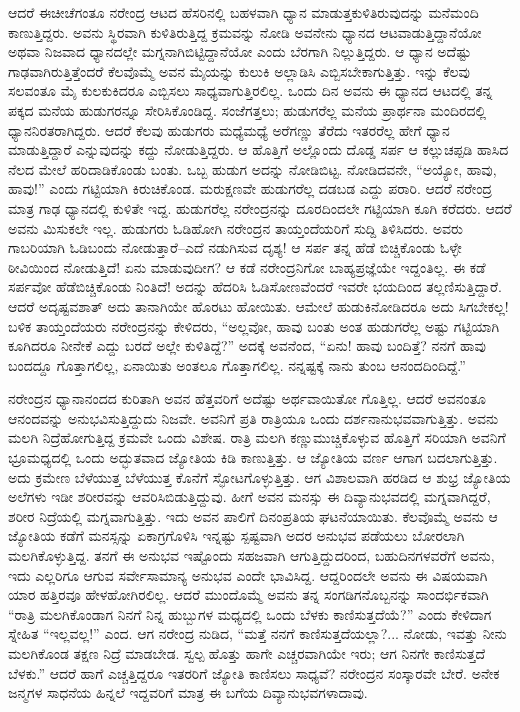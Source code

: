 ಆದರೆ ಈಚೀಚೆಗಂತೂ ನರೇಂದ್ರ ಆಟದ ಹೆಸರಿನಲ್ಲಿ ಬಹಳವಾಗಿ ಧ್ಯಾನ ಮಾಡುತ್ತಕುಳಿತಿರುವುದನ್ನು ಮನೆಮಂದಿ ಕಾಣುತ್ತಿದ್ದರು. ಅವನು ಸ್ಥಿರವಾಗಿ ಕುಳಿತಿರುತ್ತಿದ್ದ ಕ್ರಮವನ್ನು ನೋಡಿ ಅವನೇನು ಧ್ಯಾನದ ಆಟವಾಡುತ್ತಿದ್ದಾನೆಯೋ ಅಥವಾ ನಿಜವಾದ ಧ್ಯಾನದಲ್ಲೇ ಮಗ್ನನಾಗಿಬಿಟ್ಟಿದ್ದಾನೆಯೋ ಎಂದು ಬೆರಗಾಗಿ ನಿಲ್ಲುತ್ತಿದ್ದರು. ಆ ಧ್ಯಾನ ಅದೆಷ್ಟು ಗಾಢವಾಗಿರುತ್ತಿತ್ತೆಂದರೆ ಕೆಲವೊಮ್ಮೆ ಅವನ ಮೈಯನ್ನು ಕುಲುಕಿ ಅಲ್ಲಾಡಿಸಿ ಎಬ್ಬಿಸಬೇಕಾಗುತ್ತಿತ್ತು. ಇನ್ನು ಕೆಲವು ಸಲವಂತೂ ಮೈ ಕುಲಕುಕಿದರೂ ಎಬ್ಬಿಸಲು ಸಾಧ್ಯವಾಗುತ್ತಿರಲಿಲ್ಲ. ಒಂದು ದಿನ ಅವನು ಈ ಧ್ಯಾನದ ಆಟದಲ್ಲಿ ತನ್ನ ಪಕ್ಕದ ಮನೆಯ ಹುಡುಗರನ್ನೂ ಸೇರಿಸಿಕೊಂಡಿದ್ದ. ಸಂಜೆಗತ್ತಲು; ಹುಡುಗರೆಲ್ಲ ಮನೆಯ ಪ್ರಾರ್ಥನಾ ಮಂದಿರದಲ್ಲಿ ಧ್ಯಾನನಿರತರಾಗಿದ್ದರು. ಆದರೆ ಕೆಲವು ಹುಡುಗರು ಮಧ್ಯೆಮಧ್ಯೆ ಅರೆಗಣ್ಣು ತೆರೆದು ಇತರರೆಲ್ಲ ಹೇಗೆ ಧ್ಯಾನ ಮಾಡುತ್ತಿದ್ದಾರೆ ಎನ್ನುವುದನ್ನು ಕದ್ದು ನೋಡುತ್ತಿದ್ದರು. ಆ ಹೊತ್ತಿಗೆ ಅಲ್ಲೊಂದು ದೊಡ್ಡ ಸರ್ಪ ಆ ಕಲ್ಲುಚಪ್ಪಡಿ ಹಾಸಿದ ನೆಲದ ಮೇಲೆ ಹರಿದಾಡಿಕೊಂಡು ಬಂತು. ಒಬ್ಬ ಹುಡುಗ ಅದನ್ನು ನೋಡಿಬಿಟ್ಟ. ನೋಡಿದವನೇ, “ಅಯ್ಯೋ, ಹಾವು, ಹಾವು!” ಎಂದು ಗಟ್ಟಿಯಾಗಿ ಕಿರುಚಿಕೊಂಡ. ಮರುಕ್ಷಣವೇ ಹುಡುಗರೆಲ್ಲ ದಡಬಡ ಎದ್ದು ಪರಾರಿ. ಆದರೆ ನರೇಂದ್ರ ಮಾತ್ರ ಗಾಢ ಧ್ಯಾನದಲ್ಲಿ ಕುಳಿತೇ ಇದ್ದ. ಹುಡುಗರೆಲ್ಲ ನರೇಂದ್ರನನ್ನು ದೂರದಿಂದಲೇ ಗಟ್ಟಿಯಾಗಿ ಕೂಗಿ ಕರೆದರು. ಆದರೆ ಅವನು ಮಿಸುಕಲೇ ಇಲ್ಲ. ಹುಡುಗರು ಓಡಿಹೋಗಿ ನರೇಂದ್ರನ ತಾಯ್ತಂದೆಯರಿಗೆ ಸುದ್ದಿ ತಿಳಿಸಿದರು. ಅವರು ಗಾಬರಿಯಾಗಿ ಓಡಿಬಂದು ನೋಡುತ್ತಾರೆ–ಎದೆ ನಡುಗಿಸುವ ದೃಶ್ಯ! ಆ ಸರ್ಪ ತನ್ನ ಹೆಡೆ ಬಿಚ್ಚಿಕೊಂಡು ಓಳ್ಳೇ ಠೀವಿಯಿಂದ ನೋಡುತ್ತಿದೆ! ಏನು ಮಾಡುವುದೀಗ? ಆ ಕಡೆ ನರೇಂದ್ರನಿಗೋ ಬಾಹ್ಯಪ್ರಜ್ಞೆಯೇ ಇದ್ದಂತಿಲ್ಲ. ಈ ಕಡೆ ಸರ್ಪವೋ ಹೆಡೆಬಿಚ್ಚಿಕೊಂಡು ನಿಂತಿದೆ! ಅದನ್ನು ಹೆದರಿಸಿ ಓಡಿಸೋಣವೆಂದರೆ ಇವರೇ ಭಯದಿಂದ ತಲ್ಲಣಿಸುತ್ತಿದ್ದಾರೆ. ಆದರೆ ಅದೃಷ್ಟವಶಾತ್ ಅದು ತಾನಾಗಿಯೇ ಹೊರಟು ಹೋಯಿತು. ಆಮೇಲೆ ಹುಡುಕಿನೋಡಿದರೂ ಅದು ಸಿಗಬೇಕಲ್ಲ! ಬಳಿಕ ತಾಯ್ತಂದೆಯರು ನರೇಂದ್ರನನ್ನು ಕೇಳಿದರು, “ಅಲ್ಲವೋ, ಹಾವು ಬಂತು ಅಂತ ಹುಡುಗರೆಲ್ಲ ಅಷ್ಟು ಗಟ್ಟಿಯಾಗಿ ಕೂಗಿದರೂ ನೀನೇಕೆ ಎದ್ದು ಬರದೆ ಅಲ್ಲೇ ಕುಳಿತಿದ್ದೆ?” ಅದಕ್ಕೆ ಅವನೆಂದ, “ಏನು! ಹಾವು ಬಂದಿತ್ತೆ? ನನಗೆ ಹಾವು ಬಂದದ್ದೂ ಗೊತ್ತಾಗಲಿಲ್ಲ, ಏನಾಯಿತು ಅಂತಲೂ ಗೊತ್ತಾಗಲಿಲ್ಲ. ನನ್ನಷ್ಟಕ್ಕೆ ನಾನು ತುಂಬ ಆನಂದದಿಂದಿದ್ದೆ.”

ನರೇಂದ್ರನ ಧ್ಯಾನಾನಂದದ ಕುರಿತಾಗಿ ಅವನ ಹೆತ್ತವರಿಗೆ ಅದೆಷ್ಟು ಅರ್ಥವಾಯಿತೋ ಗೊತ್ತಿಲ್ಲ. ಆದರೆ ಅವನಂತೂ ಆನಂದವನ್ನು ಅನುಭವಿಸುತ್ತಿದ್ದುದು ನಿಜವೇ. ಅವನಿಗೆ ಪ್ರತಿ ರಾತ್ರಿಯೂ ಒಂದು ದರ್ಶನಾನುಭವವಾಗುತ್ತಿತ್ತು. ಅವನು ಮಲಗಿ ನಿದ್ರೆಹೋಗುತ್ತಿದ್ದ ಕ್ರಮವೇ ಒಂದು ವಿಶೇಷ. ರಾತ್ರಿ ಮಲಗಿ ಕಣ್ಣುಮುಚ್ಚಿಕೊಳ್ಳುವ ಹೊತ್ತಿಗೆ ಸರಿಯಾಗಿ ಅವನಿಗೆ ಭ್ರೂಮಧ್ಯದಲ್ಲಿ ಒಂದು ಅದ್ಭುತವಾದ ಜ್ಯೋತಿಯ ಕಿಡಿ ಕಾಣುತ್ತಿತ್ತು. ಆ ಜ್ಯೋತಿಯ ವರ್ಣ ಆಗಾಗ ಬದಲಾಗುತ್ತಿತ್ತು. ಅದು ಕ್ರಮೇಣ ಬೆಳೆಯುತ್ತ ಬೆಳೆಯುತ್ತ ಕೊನೆಗೆ ಸ್ಫೋಟಗೊಳ್ಳುತ್ತಿತ್ತು. ಆಗ ವಿಶಾಲವಾಗಿ ಹರಡಿದ ಆ ಶುಭ್ರ ಜ್ಯೋತಿಯ ಅಲೆಗಳು ಇಡೀ ಶರೀರವನ್ನು ಆವರಿಸಿಬಿಡುತ್ತಿದ್ದುವು. ಹೀಗೆ ಅವನ ಮನಸ್ಸು ಈ ದಿವ್ಯಾನುಭವದಲ್ಲಿ ಮಗ್ನವಾಗಿದ್ದರೆ, ಶರೀರ ನಿದ್ರೆಯಲ್ಲಿ ಮಗ್ನವಾಗುತ್ತಿತ್ತು. ಇದು ಅವನ ಪಾಲಿಗೆ ದಿನಂಪ್ರತಿಯ ಘಟನೆಯಾಯಿತು. ಕೆಲವೊಮ್ಮೆ ಅವನು ಆ ಜ್ಯೋತಿಯ ಕಡೆಗೆ ಮನಸ್ಸನ್ನು ಏಕಾಗ್ರಗೊಳಿಸಿ ಇನ್ನಷ್ಟು ಸ್ಪಷ್ಟವಾಗಿ ಅದರ ಅನುಭವ ಪಡೆಯಲು ಬೋರಲಾಗಿ ಮಲಗಿಕೊಳ್ಳುತ್ತಿದ್ದ. ತನಗೆ ಈ ಅನುಭವ ಇಷ್ಟೊಂದು ಸಹಜವಾಗಿ ಆಗುತ್ತಿದ್ದುದರಿಂದ, ಬಹುದಿನಗಳವರೆಗೆ ಅವನು, ಇದು ಎಲ್ಲರಿಗೂ ಆಗುವ ಸರ್ವೇಸಾಮಾನ್ಯ ಅನುಭವ ಎಂದೇ ಭಾವಿಸಿದ್ದ. ಆದ್ದರಿಂದಲೇ ಅವನು ಈ ವಿಷಯವಾಗಿ ಯಾರ ಹತ್ತಿರವೂ ಹೇಳಹೋಗಿರಲಿಲ್ಲ. ಆದರೆ ಮುಂದೊಮ್ಮೆ ಅವನು ತನ್ನ ಸಂಗಡಿಗನೊಬ್ಬನನ್ನು ಸಾಂದರ್ಭಿಕವಾಗಿ “ರಾತ್ರಿ ಮಲಗಿಕೊಂಡಾಗ ನಿನಗೆ ನಿನ್ನ ಹುಬ್ಬುಗಳ ಮಧ್ಯದಲ್ಲಿ ಒಂದು ಬೆಳಕು ಕಾಣಿಸುತ್ತದೆಯೆ?” ಎಂದು ಕೇಳಿದಾಗ ಸ್ನೇಹಿತ “ಇಲ್ಲವಲ್ಲ!” ಎಂದ. ಆಗ ನರೇಂದ್ರ ನುಡಿದ, “ಮತ್ತೆ ನನಗೆ ಕಾಣಿಸುತ್ತದೆಯಲ್ಲಾ?... ನೋಡು, ಇವತ್ತು ನೀನು ಮಲಗಿಕೊಂಡ ತಕ್ಷಣ ನಿದ್ರೆ ಮಾಡಬೇಡ. ಸ್ವಲ್ಪ ಹೊತ್ತು ಹಾಗೇ ಎಚ್ಚರವಾಗಿಯೇ ಇರು; ಆಗ ನಿನಗೇ ಕಾಣಿಸುತ್ತದೆ ಬೆಳಕು.” ಆದರೆ ಹಾಗೆ ಎಚ್ಚತ್ತಿದ್ದರೂ ಇತರರಿಗೆ ಜ್ಯೋತಿ ಕಾಣಿಸಲು ಸಾಧ್ಯವೆ? ನರೇಂದ್ರನ ಸಂಸ್ಕಾರವೇ ಬೇರೆ. ಅನೇಕ ಜನ್ಮಗಳ ಸಾಧನೆಯ ಹಿನ್ನಲೆ ಇದ್ದವರಿಗೆ ಮಾತ್ರ ಈ ಬಗೆಯ ದಿವ್ಯಾನುಭವಗಳಾದಾವು.

